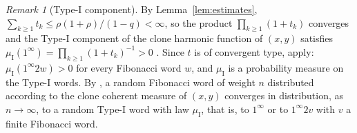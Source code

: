 \documentclass[11pt]{amsart}
\theoremstyle{definition}
\theoremstyle{remark}
\newtheorem{remark}[theorem]{Remark}
\numberwithin{equation}{section}
\begin{document}
\begin{remark}[Type-I component]
By Lemma~\ref{lem:estimates}, $\sum_{k\ge1}t_k\le\rho(1+\rho)/(1-q)<\infty$, so the product $\prod_{k\ge1}(1+t_k)$ converges and the Type-I component of the clone harmonic function of $(x,y)$ satisfies $\mu_{\mathrm I}(1^\infty)=\prod_{k\ge1}(1+t_k)^{-1}>0$ \cite[Lemma~15.3]{PS26}. Since $t$ is of convergent type, \cite[Propositions~15.4 and~15.6]{PS26} apply: $\mu_{\mathrm I}(1^\infty2w)>0$ for every Fibonacci word $w$, and $\mu_{\mathrm I}$ is a probability measure on the Type-I words. By \cite[Theorem~1.5]{PS26}, a random Fibonacci word of weight $n$ distributed according to the clone coherent measure of $(x,y)$ converges in distribution, as $n\to\infty$, to a random Type-I word with law $\mu_{\mathrm I}$, that is, to $1^\infty$ or to $1^\infty2v$ with $v$ a finite Fibonacci word.
\end{remark}
\end{document}
